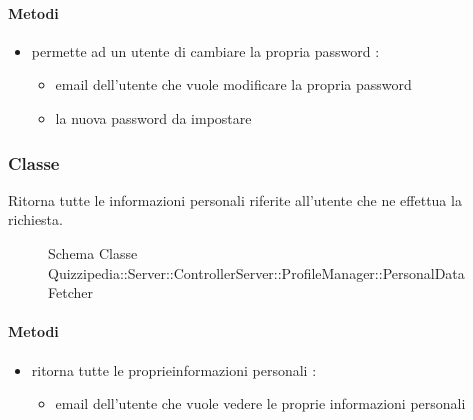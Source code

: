 \paragraph{Metodi}
\begin{itemize}
\item {}
\newline
permette ad un utente di cambiare la propria password
\newline
{} :
\begin{itemize}
\item {}
\newline
email dell'utente che vuole modificare la propria password
\item {}
\newline
la nuova password da impostare
\end{itemize}
\end{itemize}
\subsubsection{Classe }
Ritorna tutte le informazioni personali riferite all'utente che ne effettua la richiesta.
\begin{figure}[H]
\centering
\noindent{}
\caption[Schema Classe PersonalDataFetcher]{Schema Classe Quizzipedia::Server::ControllerServer::ProfileManager::PersonalDataFetcher}
\end{figure}
\paragraph{Metodi}
\begin{itemize}
\item {}
\newline
ritorna tutte le proprieinformazioni personali
\newline
{} :
\begin{itemize}
\item {}
\newline
email dell'utente che vuole vedere le proprie informazioni personali
\end{itemize}
\end{itemize}
